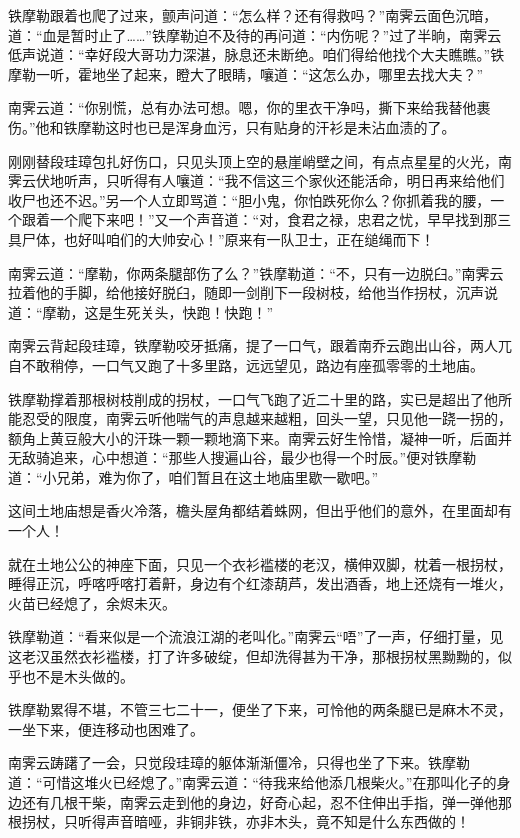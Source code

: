 \documentclass[12pt,oneside]{book}
\begin{document}
铁摩勒跟着也爬了过来，颤声问道：``怎么样？还有得救吗？''南霁云面色沉暗，道：``血是暂时止了\ldots\ldots{}''铁摩勒迫不及待的再问道：``内伤呢？''过了半晌，南霁云低声说道：``幸好段大哥功力深湛，脉息还未断绝。咱们得给他找个大夫瞧瞧。''铁摩勒一听，霍地坐了起来，瞪大了眼睛，嚷道：``这怎么办，哪里去找大夫？''

南霁云道：``你别慌，总有办法可想。嗯，你的里衣干净吗，撕下来给我替他裹伤。''他和铁摩勒这时也已是浑身血污，只有贴身的汗衫是未沾血渍的了。

刚刚替段珪璋包扎好伤口，只见头顶上空的悬崖峭壁之间，有点点星星的火光，南霁云伏地听声，只听得有人嚷道：``我不信这三个家伙还能活命，明日再来给他们收尸也还不迟。''另一个人立即骂道：``胆小鬼，你怕跌死你么？你抓着我的腰，一个跟着一个爬下来吧！''又一个声音道：``对，食君之禄，忠君之忧，早早找到那三具尸体，也好叫咱们的大帅安心！''原来有一队卫士，正在缒绳而下！

南霁云道：``摩勒，你两条腿部伤了么？''铁摩勒道：``不，只有一边脱臼。''南霁云拉着他的手脚，给他接好脱臼，随即一剑削下一段树枝，给他当作拐杖，沉声说道：``摩勒，这是生死关头，快跑！快跑！''

南霁云背起段珪璋，铁摩勒咬牙抵痛，提了一口气，跟着南乔云跑出山谷，两人兀自不敢稍停，一口气又跑了十多里路，远远望见，路边有座孤零零的土地庙。

铁摩勒撑着那根树枝削成的拐杖，一口气飞跑了近二十里的路，实已是超出了他所能忍受的限度，南霁云听他喘气的声息越来越粗，回头一望，只见他一跷一拐的，额角上黄豆般大小的汗珠一颗一颗地滴下来。南霁云好生怜惜，凝神一听，后面并无敌骑追来，心中想道：``那些人搜遍山谷，最少也得一个时辰。''便对铁摩勒道：``小兄弟，难为你了，咱们暂且在这土地庙里歇一歇吧。''

这间土地庙想是香火冷落，檐头屋角都结着蛛网，但出乎他们的意外，在里面却有一个人！

就在土地公公的神座下面，只见一个衣衫褴楼的老汉，横伸双脚，枕着一根拐杖，睡得正沉，呼喀呼喀打着鼾，身边有个红漆葫芦，发出酒香，地上还烧有一堆火，火苗已经熄了，余烬未灭。

铁摩勒道：``看来似是一个流浪江湖的老叫化。''南霁云``唔''了一声，仔细打量，见这老汉虽然衣衫褴楼，打了许多破绽，但却洗得甚为干净，那根拐杖黑黝黝的，似乎也不是木头做的。

铁摩勒累得不堪，不管三七二十一，便坐了下来，可怜他的两条腿已是麻木不灵，一坐下来，便连移动也困难了。

南霁云踌躇了一会，只觉段珪璋的躯体渐渐僵冷，只得也坐了下来。铁摩勒道：``可惜这堆火已经熄了。''南霁云道：``待我来给他添几根柴火。''在那叫化子的身边还有几根干柴，南霁云走到他的身边，好奇心起，忍不住伸出手指，弹一弹他那根拐杖，只听得声音暗哑，非铜非铁，亦非木头，竟不知是什么东西做的！
\end{document}
